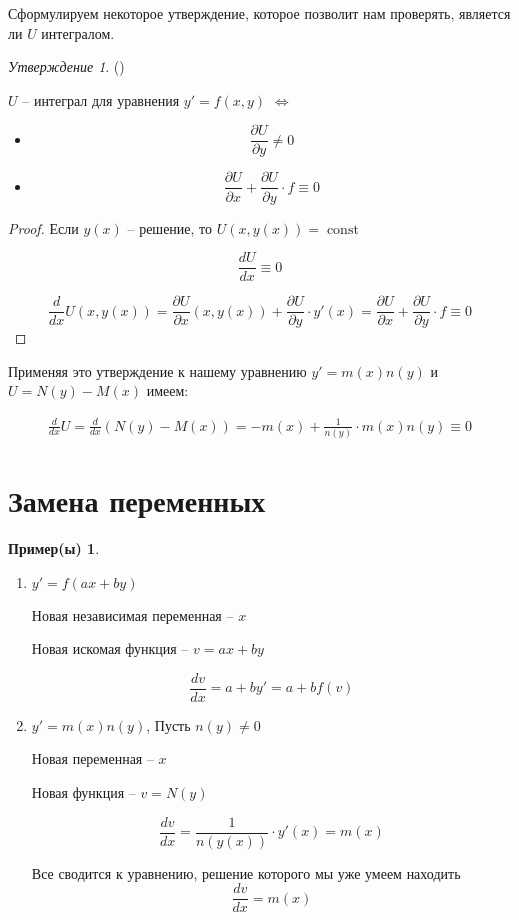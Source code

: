 \documentclass[a4paper]{article}
\theoremstyle{indented}
\theoremstyle{definition}
\newtheorem*{exl}{Пример(ы)}
\theoremstyle{remark}
\newtheorem*{stat}{Утверждение}
\DeclareMathOperator{\const}{const}
\begin{document}
Сформулируем некоторое утверждение, которое позволит нам проверять, является ли  $U$ интегралом.

\begin{stat}
  ()

  $U$ -- интеграл для уравнения $y' = f(x,y)$ $\Longleftrightarrow$
  \begin{itemize}
  \item \[\frac{\partial U}{\partial y} \not = 0\]
  \item \[\frac{\partial U}{\partial x} + \frac{\partial U}{\partial y} \cdot f \equiv 0\]
  \end{itemize}
\end{stat}

\begin{proof}
  Если $y(x)$ -- решение, то $U(x,y(x)) = \const$

  \[\frac{dU}{dx} \equiv 0
  \]

  \[\frac{d}{dx} U(x,y(x)) = \frac{\partial U}{\partial x}(x, y(x))  + \frac{\partial U}{\partial y} \cdot y'(x) =  \frac{\partial U}{\partial x} + \frac{\partial U}{\partial y} \cdot f \equiv 0
  \]
\end{proof}


Применяя это утверждение к нашему уравнению $y' = m(x)n(y)$ и $U = N(y) - M(x)$ имеем:

\begin{equation}
  \begin{gathered}
    \frac{d}{dx} U = \frac{d}{dx} (N(y) - M(x)) = -m(x) + \frac{1}{n(y)} \cdot m(x)n(y) \equiv 0
  \end{gathered}
\end{equation}

\section{Замена переменных}

\begin{exl}
  \begin{enumerate}
  \item $y' = f(ax +by)$
    
    Новая независимая переменная -- $x$

    Новая искомая функция -- $v = ax+by$

    \[\frac{dv}{dx} = a+by' = a + bf(v)\]

  \item $y' = m(x) n(y)$,  Пусть $n(y) \neq 0 $

    Новая переменная -- $x$

    Новая функция -- $v = N(y)$

    \[\frac{dv}{dx} = \frac{1}{n(y(x))} \cdot y'(x) = m(x)\]
    
    Все сводится к уравнению, решение которого мы уже умеем находить
    \[\frac{dv}{dx} = m(x)\]
    


  \end{enumerate}
\end{exl}
\end{document}
